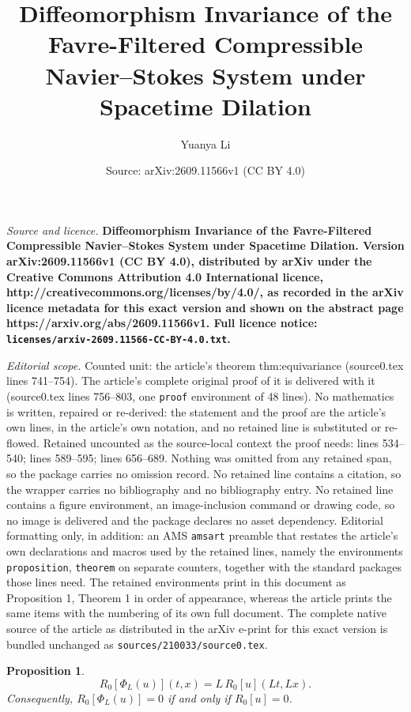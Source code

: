 \documentclass[10pt,a4paper]{amsart}
\title{\bfseries Diffeomorphism Invariance of the Favre-Filtered Compressible Navier--Stokes System under Spacetime Dilation}
\author{Yuanya Li}
\date{Source: arXiv:2609.11566v1 (CC BY 4.0)}
\newtheorem{proposition}{Proposition}
\begin{document}
\maketitle

\noindent\emph{Source and licence.} \bfseries Diffeomorphism Invariance of the Favre-Filtered Compressible Navier--Stokes System under Spacetime Dilation. Version arXiv:2609.11566v1 (CC BY 4.0), distributed by arXiv under the Creative Commons Attribution 4.0 International licence, http://creativecommons.org/licenses/by/4.0/, as recorded in the arXiv licence metadata for this exact version and shown on the abstract page https://arxiv.org/abs/2609.11566v1. Full licence notice: \texttt{licenses/arxiv-2609.11566-CC-BY-4.0.txt}.\par\smallskip

\noindent\textit{Editorial scope.} Counted unit: the article's theorem thm:equivariance (source0.tex lines 741--754). The article's complete original proof of it is delivered with it (source0.tex lines 756--803, one \texttt{proof} environment of 48 lines). No mathematics is written, repaired or re-derived: the statement and the proof are the article's own lines, in the article's own notation, and no retained line is substituted or re-flowed.  Retained uncounted as the source-local context the proof needs: lines 534--540; lines 589--595; lines 656--689.  Nothing was omitted from any retained span, so the package carries no omission record.  No retained line contains a citation, so the wrapper carries no bibliography and no bibliography entry.  No retained line contains a figure environment, an image-inclusion command or drawing code, so no image is delivered and the package declares no asset dependency.  Editorial formatting only, in addition: an AMS \texttt{amsart} preamble that restates the article's own declarations and macros used by the retained lines, namely the environments \texttt{proposition}, \texttt{theorem} on separate counters, together with the standard packages those lines need.  The retained environments print in this document as Proposition 1, Theorem 1 in order of appearance, whereas the article prints the same items with the numbering of its own full document.  The complete native source of the article as distributed in the arXiv e-print for this exact version is bundled unchanged as \texttt{sources/210033/source0.tex}.
\begin{proposition}
\label{prop:continuity}
\[
R_0[\Phi_L(u)](t,x)=L\,R_0[u](Lt,Lx).
\]
Consequently, $R_0[\Phi_L(u)]=0$ if and only if $R_0[u]=0$.
\end{proposition}
\end{document}
